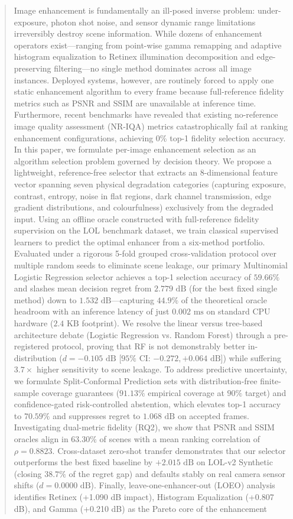 \documentclass[journal]{IEEEtran}
\begin{document}
\begin{abstract}
Image enhancement is fundamentally an ill-posed inverse problem: under-exposure, photon shot noise, and sensor dynamic range limitations irreversibly destroy scene information. While dozens of enhancement operators exist—ranging from point-wise gamma remapping and adaptive histogram equalization to Retinex illumination decomposition and edge-preserving filtering—no single method dominates across all image instances. Deployed systems, however, are routinely forced to apply one static enhancement algorithm to every frame because full-reference fidelity metrics such as PSNR and SSIM are unavailable at inference time. Furthermore, recent benchmarks have revealed that existing no-reference image quality assessment (NR-IQA) metrics catastrophically fail at ranking enhancement configurations, achieving 0\% top-1 fidelity selection accuracy. In this paper, we formulate per-image enhancement selection as an algorithm selection problem governed by decision theory. We propose a lightweight, reference-free selector that extracts an 8-dimensional feature vector spanning seven physical degradation categories (capturing exposure, contrast, entropy, noise in flat regions, dark channel transmission, edge gradient distributions, and colourfulness) exclusively from the degraded input. Using an offline oracle constructed with full-reference fidelity supervision on the LOL benchmark dataset, we train classical supervised learners to predict the optimal enhancer from a six-method portfolio. Evaluated under a rigorous 5-fold grouped cross-validation protocol over multiple random seeds to eliminate scene leakage, our primary Multinomial Logistic Regression selector achieves a top-1 selection accuracy of $59.66\%$ and slashes mean decision regret from $2.779\text{ dB}$ (for the best fixed single method) down to $1.532\text{ dB}$—capturing $44.9\%$ of the theoretical oracle headroom with an inference latency of just $0.002\text{ ms}$ on standard CPU hardware ($2.4\text{ KB}$ footprint). We resolve the linear versus tree-based architecture debate (Logistic Regression vs. Random Forest) through a pre-registered protocol, proving that RF is not demonstrably better in-distribution ($d = -0.105\text{ dB}$ [$95\%$ CI: $-0.272, +0.064\text{ dB}$]) while suffering $3.7\times$ higher sensitivity to scene leakage. To address predictive uncertainty, we formulate Split-Conformal Prediction sets with distribution-free finite-sample coverage guarantees ($91.13\%$ empirical coverage at $90\%$ target) and confidence-gated risk-controlled abstention, which elevates top-1 accuracy to $70.59\%$ and suppresses regret to $1.068\text{ dB}$ on accepted frames. Investigating dual-metric fidelity (RQ2), we show that PSNR and SSIM oracles align in $63.30\%$ of scenes with a mean ranking correlation of $\rho = 0.8823$. Cross-dataset zero-shot transfer demonstrates that our selector outperforms the best fixed baseline by $+2.015\text{ dB}$ on LOL-v2 Synthetic (closing $38.7\%$ of the regret gap) and defaults stably on real camera sensor shifts ($d = 0.0000\text{ dB}$). Finally, leave-one-enhancer-out (LOEO) analysis identifies Retinex (+1.090 dB impact), Histogram Equalization (+0.807 dB), and Gamma (+0.210 dB) as the Pareto core of the enhancement 
\end{abstract}
\end{document}
